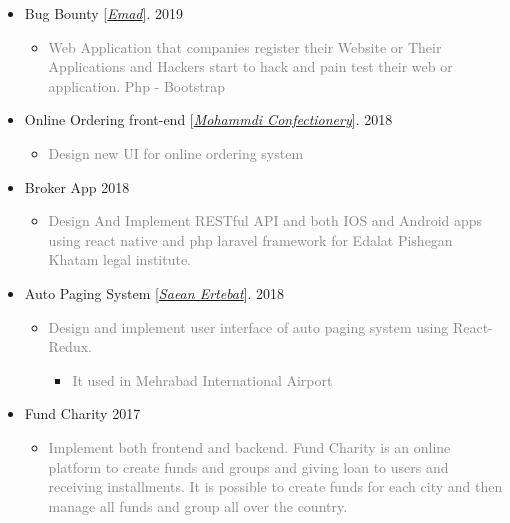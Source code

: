 \documentclass[10pt,a4paper,sans]{moderncv} %
\begin{document}
\begin{itemize}
		\item Bug Bounty [\href{http://emad24.ir/}{\emph{Emad}}]. \hfill 2019
		\begin{itemize}
			\item \textcolor{gray} {Web Application that companies register their Website or Their Applications and Hackers start to hack and pain test their web or application. Php - Bootstrap}
		\end{itemize}

		\item Online Ordering front-end [\href{http://#/}{\emph{Mohammdi Confectionery}}]. \hfill 2018
		\begin{itemize}
			\item \textcolor{gray} { Design new UI for online ordering system }
		\end{itemize}

		\item Broker App \hfill 2018
		\begin{itemize}
			\item \textcolor{gray} { Design And Implement RESTful API and both IOS and Android apps using react native and php laravel framework for Edalat Pishegan Khatam legal institute. }
		\end{itemize}

		\item Auto Paging System [\href{http://www.senatelecom.com/}{\emph{Saean Ertebat}}]. \hfill 2018
		\begin{itemize}
			\item \textcolor{gray} {Design and implement user interface of auto paging system using React-Redux.}
			\begin{itemize}
				\item \textcolor{gray} {It used in Mehrabad International Airport}
			\end{itemize}
		\end{itemize}

		\item Fund Charity \hfill 2017
		\begin{itemize}
			\item \textcolor{gray} {  Implement both frontend and backend. Fund Charity is an online platform to create funds and groups and giving loan to users and receiving installments. It is possible to create funds for each city and then manage all funds and group all over the country. }
		\end{itemize}


\end{itemize}
\end{document}
